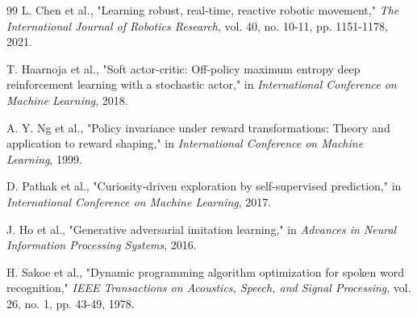 \documentclass[10pt,twocolumn]{article}
\begin{document}
\begin{thebibliography}{99}
L. Chen et al., "Learning robust, real-time, reactive robotic movement," \emph{The International Journal of Robotics Research}, vol. 40, no. 10-11, pp. 1151-1178, 2021.

T. Haarnoja et al., "Soft actor-critic: Off-policy maximum entropy deep reinforcement learning with a stochastic actor," in \emph{International Conference on Machine Learning}, 2018.

A. Y. Ng et al., "Policy invariance under reward transformations: Theory and application to reward shaping," in \emph{International Conference on Machine Learning}, 1999.

D. Pathak et al., "Curiosity-driven exploration by self-supervised prediction," in \emph{International Conference on Machine Learning}, 2017.

J. Ho et al., "Generative adversarial imitation learning," in \emph{Advances in Neural Information Processing Systems}, 2016.

H. Sakoe et al., "Dynamic programming algorithm optimization for spoken word recognition," \emph{IEEE Transactions on Acoustics, Speech, and Signal Processing}, vol. 26, no. 1, pp. 43-49, 1978.

\end{thebibliography}
\end{document}

